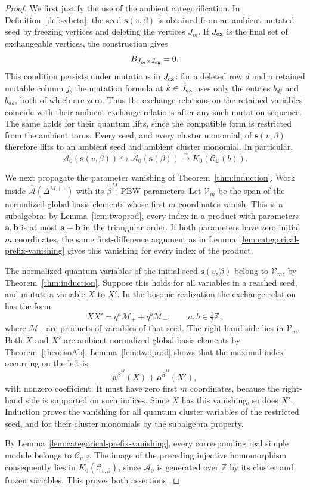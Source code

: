 \documentclass[12pt, reqno]{amsart}
\theoremstyle{plain}
\theoremstyle{definition}
\numberwithin{equation}{section}
\newcommand{\ZZ}{\mathbb{Z}}
\newcommand{\DD}{\mathbb{D}}
\newcommand{\bfa}{\mathbf{a}}
\newcommand{\cA}{\mathcal{A}}
\begin{document}
\begin{proof}
We first justify the use of the ambient categorification. In
Definition~\ref{def:svbeta}, the seed \(\mathbf s(v,\beta)\) is
obtained from an ambient mutated seed by freezing vertices and
deleting the vertices \(J_m\). If \(J_{\rm ex}\) is the final set of
exchangeable vertices, the construction gives
\[
B_{J_m\times J_{\rm ex}}=0.
\]
This condition persists under mutations in \(J_{\rm ex}\): for a
deleted row \(d\) and a retained mutable column \(j\), the mutation
formula at \(k\in J_{\rm ex}\) uses only the entries \(b_{dj}\) and
\(b_{dk}\), both of which are zero. Thus the exchange relations on
the retained variables coincide with their ambient exchange
relations after any such mutation sequence. The same holds for
their quantum lifts, since the compatible form is restricted from
the ambient torus. Every seed, and every cluster monomial, of
\(\mathbf s(v,\beta)\) therefore lifts to an ambient seed and
ambient cluster monomial. In particular,
\[
\cA_0(\mathbf s(v,\beta))\hookrightarrow
\cA_0(\mathbf s(\beta))
\xrightarrow{\sim}K_0(\mathscr C_{\DD}(b)).
\]

We next propagate the parameter vanishing of
Theorem~\ref{thm:induction}. Work inside
\(\widehat{\cA}(\Delta^{M+1})\) with its \(\dot\beta^M\)-PBW
parameters. Let \(\mathcal V_m\) be the span of the normalized global
basis elements whose first \(m\) coordinates vanish. This is a
subalgebra: by Lemma~\ref{lem:twoprod}, every index in a product with
parameters \(\mathbf a,\mathbf b\) is at most
\(\mathbf a+\mathbf b\) in the triangular order. If both parameters
have zero initial \(m\) coordinates, the same first-difference
argument as in Lemma~\ref{lem:categorical-prefix-vanishing} gives this
vanishing for every index of the product.

The normalized quantum variables of the initial seed
\(\mathbf s(v,\beta)\) belong to \(\mathcal V_m\), by
Theorem~\ref{thm:induction}. Suppose this holds for all variables in
a reached seed, and mutate a variable \(X\) to \(X'\). In the
bosonic realization the exchange relation has the form
\[
XX'=q^a\mathcal M_+ +q^b\mathcal M_-,
\qquad a,b\in\tfrac12\ZZ,
\]
where \(\mathcal M_\pm\) are products of variables of that seed.
The right-hand side lies in \(\mathcal V_m\). Both \(X\) and \(X'\)
are ambient normalized global basis elements by
Theorem~\ref{theo:isoAb}. Lemma~\ref{lem:twoprod} shows that the
maximal index occurring on the left is
\[
\bfa^{\dot\beta^M}(X)+\bfa^{\dot\beta^M}(X'),
\]
with nonzero coefficient. It must have zero first \(m\) coordinates,
because the right-hand side is supported on such indices. Since
\(X\) has this vanishing, so does \(X'\). Induction proves the
vanishing for all quantum cluster variables of the restricted seed,
and for their cluster monomials by the subalgebra property.

By Lemma~\ref{lem:categorical-prefix-vanishing}, every corresponding
real simple module belongs to \(\mathscr C_{v,\beta}\). The image of
the preceding injective homomorphism consequently lies in
\(K_0(\mathscr C_{v,\beta})\), since \(\cA_0\) is generated over
\(\ZZ\) by its cluster and frozen variables. This proves both
assertions.
\end{proof}
\end{document}
